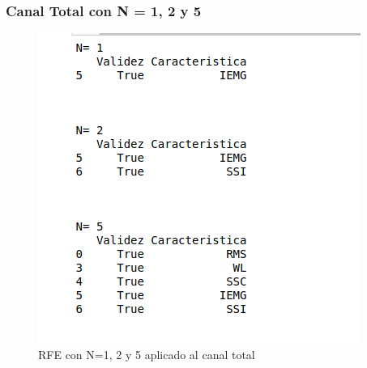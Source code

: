         
        \subsubsection{Canal Total con N = 1, 2 y 5}
        \begin{figure}[ht]
            \centering
            \includegraphics[scale=0.3]{imagenes/RFE canal total.png}
            \caption{RFE con N=1, 2 y 5 aplicado al canal total}
            \label{fig:REF canal total}
        \end{figure}
        
        
        
        
        
        
        
        
        
        
        
